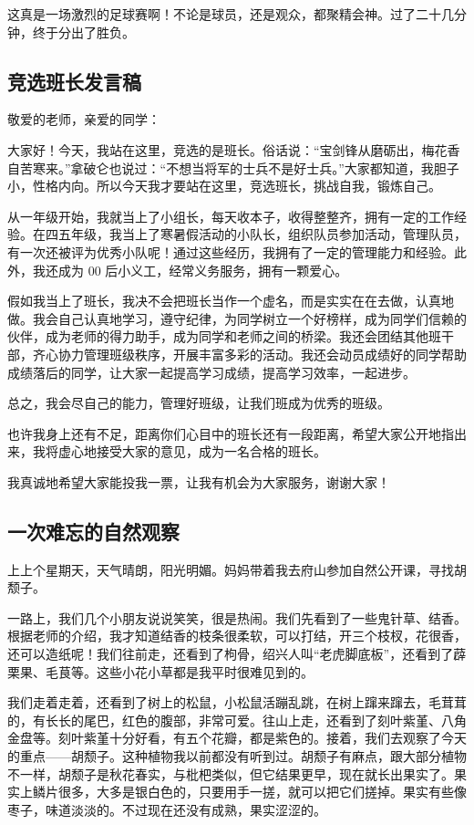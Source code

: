\documentclass[UTF8,a4paper,titlepage,twoside,10.5pt]{article}
\begin{document}
这真是一场激烈的足球赛啊！不论是球员，还是观众，都聚精会神。过了二十几分钟，终于分出了胜负。

\subsection{竞选班长发言稿}
\label{sec:orgd1a17ab}

\noindent
敬爱的老师，亲爱的同学：

大家好！今天，我站在这里，竞选的是班长。俗话说：“宝剑锋从磨砺出，梅花香自苦寒来。”拿破仑也说过：“不想当将军的士兵不是好士兵。”大家都知道，我胆子小，性格内向。所以今天我才要站在这里，竞选班长，挑战自我，锻炼自己。

从一年级开始，我就当上了小组长，每天收本子，收得整整齐，拥有一定的工作经验。在四五年级，我当上了寒暑假活动的小队长，组织队员参加活动，管理队员，有一次还被评为优秀小队呢！通过这些经历，我拥有了一定的管理能力和经验。此外，我还成为 00 后小义工，经常义务服务，拥有一颗爱心。

假如我当上了班长，我决不会把班长当作一个虚名，而是实实在在去做，认真地做。我会自己认真地学习，遵守纪律，为同学树立一个好榜样，成为同学们信赖的伙伴，成为老师的得力助手，成为同学和老师之间的桥梁。我还会团结其他班干部，齐心协力管理班级秩序，开展丰富多彩的活动。我还会动员成绩好的同学帮助成绩落后的同学，让大家一起提高学习成绩，提高学习效率，一起进步。

总之，我会尽自己的能力，管理好班级，让我们班成为优秀的班级。

也许我身上还有不足，距离你们心目中的班长还有一段距离，希望大家公开地指出来，我将虚心地接受大家的意见，成为一名合格的班长。

我真诚地希望大家能投我一票，让我有机会为大家服务，谢谢大家！

\subsection{一次难忘的自然观察}
\label{sec:orgcaa7922}

上上个星期天，天气晴朗，阳光明媚。妈妈带着我去府山参加自然公开课，寻找胡颓子。

一路上，我们几个小朋友说说笑笑，很是热闹。我们先看到了一些鬼针草、结香。根据老师的介绍，我才知道结香的枝条很柔软，可以打结，开三个枝杈，花很香，还可以造纸呢！我们往前走，还看到了枸骨，绍兴人叫“老虎脚底板”，还看到了薜栗果、毛茛等。这些小花小草都是我平时很难见到的。

我们走着走着，还看到了树上的松鼠，小松鼠活蹦乱跳，在树上蹿来蹿去，毛茸茸的，有长长的尾巴，红色的腹部，非常可爱。往山上走，还看到了刻叶紫堇、八角金盘等。刻叶紫堇十分好看，有五个花瓣，都是紫色的。接着，我们去观察了今天的重点——胡颓子。这种植物我以前都没有听到过。胡颓子有麻点，跟大部分植物不一样，胡颓子是秋花春实，与枇杷类似，但它结果更早，现在就长出果实了。果实上鳞片很多，大多是银白色的，只要用手一搓，就可以把它们搓掉。果实有些像枣子，味道淡淡的。不过现在还没有成熟，果实涩涩的。
\end{document}
